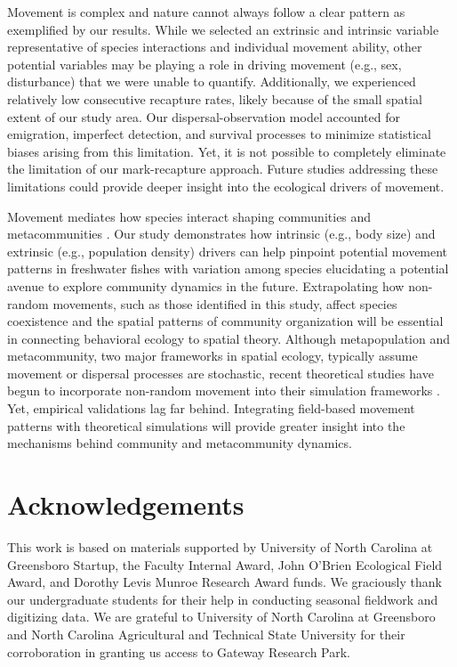 \documentclass[11pt, class=article, crop=false]{standalone}
\begin{document}
Movement is complex and nature cannot always follow a clear pattern as exemplified by our results. While we selected an extrinsic and intrinsic variable representative of species interactions and individual movement ability, other potential variables may be playing a role in driving movement (e.g., sex, disturbance) that we were unable to quantify. Additionally, we experienced relatively low consecutive recapture rates, likely because of the small spatial extent of our study area. Our dispersal-observation model accounted for emigration, imperfect detection, and survival processes to minimize statistical biases arising from this limitation. Yet, it is not possible to completely eliminate the limitation of our mark-recapture approach. Future studies addressing these limitations could provide deeper insight into the ecological drivers of movement.

Movement mediates how species interact shaping communities and metacommunities \citep{schlagelMovementmediatedCommunityAssembly2020}. Our study demonstrates how intrinsic (e.g., body size) and extrinsic (e.g., population density) drivers can help pinpoint potential movement patterns in freshwater fishes with variation among species elucidating a potential avenue to explore community dynamics in the future. Extrapolating how non-random movements, such as those identified in this study, affect species coexistence and the spatial patterns of community organization will be essential in connecting behavioral ecology to spatial theory. Although metapopulation and metacommunity, two major frameworks in spatial ecology, typically assume movement or dispersal processes are stochastic, recent theoretical studies have begun to incorporate non-random movement into their simulation frameworks \citep{amarasekareEffectNonrandomDispersal2010, ruokolainenStableCoexistenceEcologically2016}. Yet, empirical validations lag far behind. Integrating field-based movement patterns with theoretical simulations will provide greater insight into the mechanisms behind community and metacommunity dynamics.

\section*{Acknowledgements}

This work is based on materials supported by University of North Carolina at Greensboro Startup, the Faculty Internal Award, John O'Brien Ecological Field Award, and Dorothy Levis Munroe Research Award funds. We graciously thank our undergraduate students for their help in conducting seasonal fieldwork and digitizing data. We are grateful to University of North Carolina at Greensboro and North Carolina Agricultural and Technical State University for their corroboration in granting us access to Gateway Research Park. 
\end{document}
